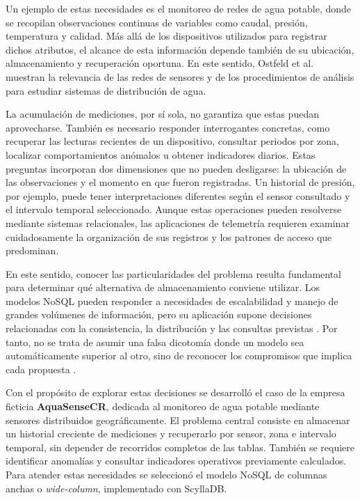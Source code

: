 \documentclass[conference]{IEEEtran}
\begin{document}
Un ejemplo de estas necesidades es el monitoreo de redes de agua potable, donde se recopilan observaciones continuas de variables como caudal, presión, temperatura y calidad. Más allá de los dispositivos utilizados para registrar dichos atributos, el alcance de esta información depende también de su ubicación, almacenamiento y recuperación oportuna. En este sentido, Ostfeld et al. \cite{ostfeld08} muestran la relevancia de las redes de sensores y de los procedimientos de análisis para estudiar sistemas de distribución de agua.

La acumulación de mediciones, por sí sola, no garantiza que estas puedan aprovecharse. También es necesario responder interrogantes concretas, como recuperar las lecturas recientes de un dispositivo, consultar periodos por zona, localizar comportamientos anómalos u obtener indicadores diarios. Estas preguntas incorporan dos dimensiones que no pueden desligarse: la ubicación de las observaciones y el momento en que fueron registradas. Un historial de presión, por ejemplo, puede tener interpretaciones diferentes según el sensor consultado y el intervalo temporal seleccionado. Aunque estas operaciones pueden resolverse mediante sistemas relacionales, las aplicaciones de telemetría requieren examinar cuidadosamente la organización de sus registros y los patrones de acceso que predominan.

En este sentido, conocer las particularidades del problema resulta fundamental para determinar qué alternativa de almacenamiento conviene utilizar. Los modelos NoSQL pueden responder a necesidades de escalabilidad y manejo de grandes volúmenes de información, pero su aplicación supone decisiones relacionadas con la consistencia, la distribución y las consultas previstas \cite{schreiner2019}. Por tanto, no se trata de asumir una falsa dicotomía donde un modelo sea automáticamente superior al otro, sino de reconocer los compromisos que implica cada propuesta \cite{cattell11}.

Con el propósito de explorar estas decisiones se desarrolló el caso de la empresa ficticia \textbf{AquaSenseCR}, dedicada al monitoreo de agua potable mediante sensores distribuidos geográficamente. El problema central consiste en almacenar un historial creciente de mediciones y recuperarlo por sensor, zona e intervalo temporal, sin depender de recorridos completos de las tablas. También se requiere identificar anomalías y consultar indicadores operativos previamente calculados. Para atender estas necesidades se seleccionó el modelo NoSQL de columnas anchas o \textit{wide-column}, implementado con ScyllaDB.
\end{document}
